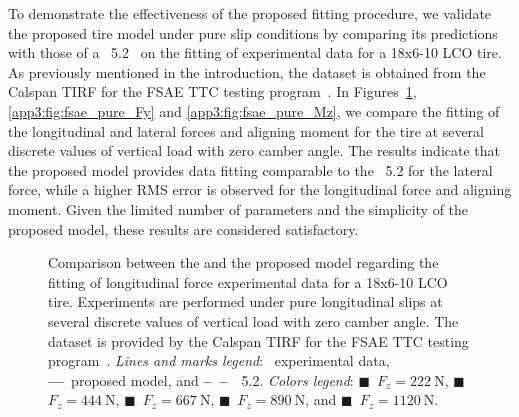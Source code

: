 To demonstrate the effectiveness of the proposed fitting procedure, we validate the proposed tire model under pure slip conditions by comparing its predictions with those of a \MagicFormulae{}~5.2~\cite{pacejka2012tire} on the fitting of experimental data for a \Hoosier{} 18x6-10 LCO tire. As previously mentioned in the introduction, the dataset is obtained from the Calspan \ac{TIRF} for the \ac{FSAE} \ac{TTC} testing program~\cite{kasprzak2006formula}. In Figures~\ref{app3:fig:fsae_pure_Fx}, \ref{app3:fig:fsae_pure_Fy} and \ref{app3:fig:fsae_pure_Mz}, we compare the fitting of the longitudinal and lateral forces and aligning moment for the \Hoosier{} tire at several discrete values of vertical load with zero camber angle. The results indicate that the proposed model provides data fitting comparable to the \MagicFormulae{}~5.2 for the lateral force, while a higher \ac{RMS} error is observed for the longitudinal force and aligning moment. Given the limited number of parameters and the simplicity of the proposed model, these results are considered satisfactory.

\begin{figure}[htb]
  \centering
  \small{}
  \caption{Comparison between the \MagicFormulae{} and the proposed model regarding the fitting of longitudinal force experimental data for a \Hoosier{} 18x6-10 LCO tire. Experiments are performed under pure longitudinal slips at several discrete values of vertical load with zero camber angle. The dataset is provided by the Calspan \ac{TIRF} for the \ac{FSAE} \ac{TTC} testing program~\cite{kasprzak2006formula}. \emph{Lines and marks legend}: \textbullet~experimental data, \textbf{---}~proposed model, and \textbf{--~--}~\MagicFormulae{}~5.2. \emph{Colors legend}: \textcolor{mycolor1}{$\blacksquare$}~$F_z = \SI{222}{\newton}$, \textcolor{mycolor2}{$\blacksquare$}~$F_z = \SI{444}{\newton}$, \textcolor{mycolor3}{$\blacksquare$}~$F_z = \SI{667}{\newton}$, \textcolor{mycolor4}{$\blacksquare$}~$F_z = \SI{890}{\newton}$, and \textcolor{mycolor5}{$\blacksquare$}~$F_z = \SI{1120}{\newton}$.}
  \label{app3:fig:fsae_pure_Fx}
\end{figure}

